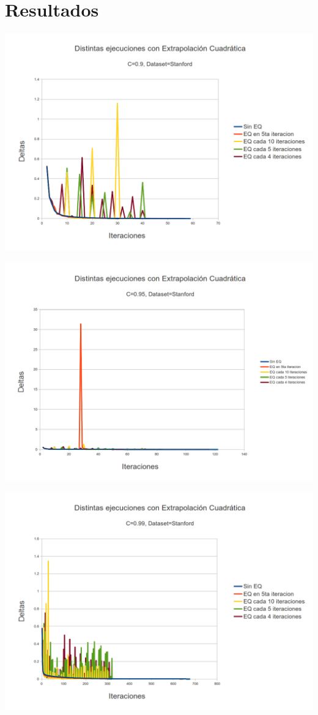 \section{Resultados}

\begin{center}
  \centering
  \includegraphics[scale=0.5]{./archivos/graficos/grafico1.png}
\end{center}

\begin{center}
  \centering
  \includegraphics[scale=0.5]{./archivos/graficos/grafico2.png}
\end{center}

\begin{center}
  \centering
  \includegraphics[scale=0.5]{./archivos/graficos/grafico3.png}
\end{center}